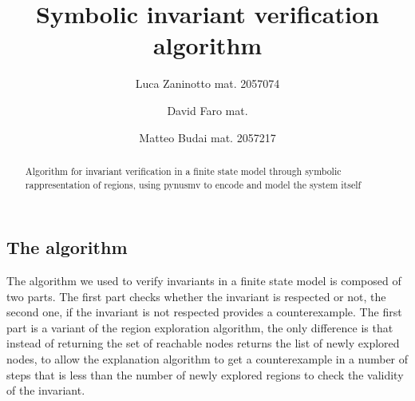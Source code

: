 \documentclass[9pt,oneside]{amsart}
\title{Symbolic invariant verification algorithm}
\author{
  Luca Zaninotto mat. 2057074 
  \and
  David Faro mat. 
  \and
  Matteo Budai mat. 2057217
}
\begin{document}
\begin{abstract}
  Algorithm for invariant verification in a finite state model through
  symbolic rappresentation of regions, using pynusmv to encode and
  model the system itself
\end{abstract}
\maketitle
\setlength{\columnsep}{20pt}
\begin{multicols}{2}
\section{The algorithm}\label{algo}
The algorithm we used to verify invariants in a finite state model is
composed of two parts. The first part checks whether the invariant is
respected or not, the second one, if the invariant is not respected
provides a counterexample. The first part is a variant of the region
exploration algorithm, the only difference is that instead of returning
the set of reachable nodes returns the list of newly explored nodes,
to allow the explanation algorithm to get a counterexample in a number
of steps that is less than the number of newly explored regions to check
the validity of the invariant.


\end{multicols}
\end{document}
